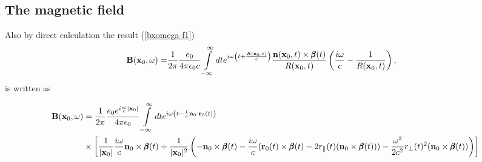 \subsection{The magnetic field}
Also by direct calculation the result (\ref{bxomega-f1})
\begin{align}
    {\bf B}({\bf x}_0,\omega)= & \frac1{2\pi}\frac{e_0}{4\pi\epsilon_0c}\int\limits_{-\infty}^{\infty}dt e^{i\omega \left(t+\frac{R({\bf x}_0,t)}c\right)}\frac{{\bf n}({\bf x}_0,t)\times{\pmb \beta}(t)}{R({\bf x}_0,t)}\left(\frac{i\omega}c-\frac{1}{R({\bf x}_0,t)}\right),\label{bxomega-f1}
\end{align}
is written as
\begin{tcolorbox}[colback=blue!5!white,colframe=blue!75!black]
    \begin{align}
        {\bf B}({\bf x}_0,\omega) & =\frac1{2\pi}\frac{e_0 e^{i\frac{\omega}{c}|{\bf x}_0|}}{4\pi\epsilon_0}\int\limits_{-\infty}^{\infty}dte^{i\omega\left( t-\frac1c{\bf n}_0\cdot{\bf r}_0(t)\right)}\nonumber                                                                                                                                                    \\
                                  & \times\left[\frac1{|{\bf x}_0|}\frac{i\omega}c{\bf n}_0\times{\pmb \beta}(t)+\frac1{|{\bf x}_0|^2}\left(-{\bf n}_0\times{\pmb \beta}(t) - \frac{i\omega}c({\bf r}_0(t)\times{\pmb \beta}(t) - 2 r_\parallel(t)({\bf n}_0\times{\pmb \beta}(t)))-\frac{\omega^2}{2c^2} r_\perp(t)^2({\bf n}_0\times{\pmb \beta}(t))\right)\right]
    \end{align}
\end{tcolorbox}

